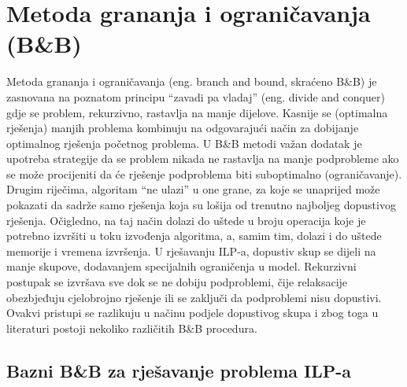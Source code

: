 \documentclass[a4paper, utf8, 11pt, colorlinks]{book}
\theoremstyle{definition}
\begin{document}
\section{Metoda grananja i ograničavanja (B\&B)}\label{sec:bb}
Metoda grananja i ograničavanja (eng. branch and bound, skraćeno B\&B) je zasnovana na poznatom principu ``zavadi pa vladaj'' (eng. divide and conquer) gdje se problem, rekurzivno, rastavlja na manje dijelove. Kasnije se (optimalna rješenja) manjih problema kombinuju na odgovarajući način za dobijanje optimalnog rješenja početnog problema.  U B\&B metodi važan dodatak je upotreba strategije da se 
problem nikada ne rastavlja na manje podprobleme ako se može procijeniti da će rješenje podproblema biti suboptimalno (ograničavanje). Drugim riječima, algoritam ``ne ulazi'' u one grane, za koje se unaprijed može pokazati da sadrže samo  rješenja koja su lošija od trenutno najboljeg dopustivog rješenja. Očigledno, na taj način dolazi do uštede u broju operacija koje je potrebno izvršiti u toku izvođenja algoritma, a, samim tim, dolazi i do uštede memorije i vremena izvršenja. U rješavanju ILP-a, dopustiv skup se dijeli na manje skupove, dodavanjem specijalnih ograničenja u model. Rekurzivni postupak se izvršava sve  dok se ne dobiju podproblemi, čije relaksacije obezbjeđuju cjelobrojno rješenje ili se zaključi da podproblemi nisu dopustivi. Ovakvi pristupi se razlikuju u načinu podjele dopustivog skupa i zbog toga  u literaturi  postoji nekoliko različitih B\&B procedura. 

\subsection{Bazni B\&B za rješavanje problema ILP-a}
\end{document}
